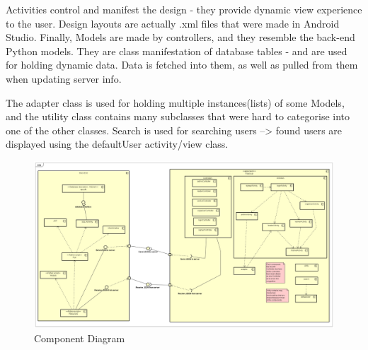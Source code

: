 			Activities control and manifest the design - they provide dynamic view experience to the user. Design layouts are actually .xml files that were made in Android Studio. Finally, Models are made by controllers, and they resemble the back-end Python models. They are class manifestation of database tables - and are used for holding dynamic data. Data is fetched into them, as well as pulled from them when updating server info.
			
			The adapter class is used for holding multiple instances(lists) of some Models, and the utility class contains many subclasses that were hard to categorise into one of the other classes. Search is used for searching users --> found users are displayed using the defaultUser activity/view class.
		
			\begin{figure}[H]
				\includegraphics[width=\linewidth]{diagrams/Component Diagram0.png}
				\caption{Component Diagram}
				\label{fig:component_diag}
			\end{figure}
		
			\eject
				
